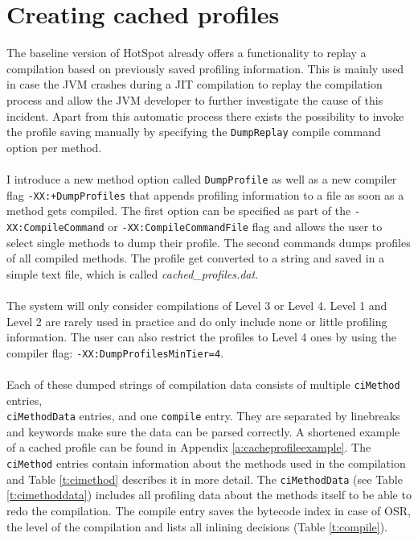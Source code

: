 \section{Creating cached profiles}
\label{s:creatingprofiles}
The baseline version of HotSpot already offers a functionality to replay a compilation based on previously saved profiling information.
This is mainly used in case the JVM crashes during a JIT compilation to replay the compilation process and allow the JVM developer to further investigate the cause of this incident.
Apart from this automatic process there exists the possibility to invoke the profile saving manually by specifying the \texttt{DumpReplay} compile command option per method.
\\\\
I introduce a new method option called \texttt{DumpProfile} as well as a new compiler flag \newline\texttt{-XX:+DumpProfiles} that appends profiling information to a file as soon as a method gets compiled. The first option can be specified as part of the \texttt{-XX:CompileCommand} or \texttt{-XX:CompileCommandFile} flag and allows the user to select single methods to dump their profile. The second commands dumps profiles of all compiled methods.
The profile get converted to a string and saved in a simple text file, which is called \textit{cached\_profiles.dat}.
\\\\
The system will only consider compilations of Level 3 or Level 4. Level 1 and Level 2 are rarely used in practice and do only include none or little profiling information. The user can also restrict the profiles to Level 4 ones by using the compiler flag: \texttt{-XX:DumpProfilesMinTier=4}.
\\\\
Each of these dumped strings of compilation data consists of multiple \texttt{ciMethod} entries, \\\texttt{ciMethodData} entries, and one \texttt{compile} entry. They are separated by linebreaks and keywords make sure the data can be parsed correctly. A shortened example of a cached profile can be found in Appendix \ref{a:cacheprofileexample}. The \texttt{ciMethod} entries contain information about the methods used in the compilation and Table \ref{t:cimethod} describes it in more detail. The \texttt{ciMethodData} (see Table \ref{t:cimethoddata}) includes all profiling data about the methods itself to be able to redo the compilation.
The compile entry saves the bytecode index in case of OSR, the level of the compilation and lists all inlining decisions (Table \ref{t:compile}).
